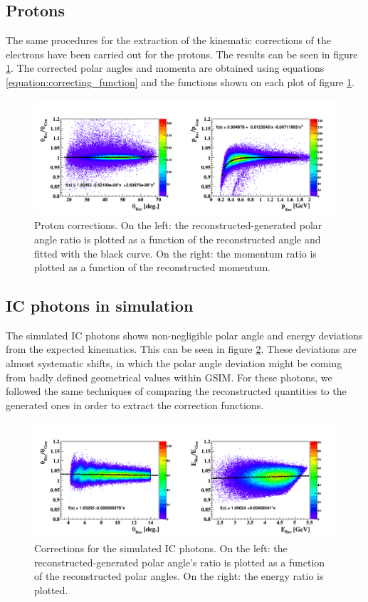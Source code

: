 \subsection{Protons}
The same procedures for the extraction of the kinematic corrections of the electrons have been carried out for the protons. The results can be seen in figure \ref{fig:proton_corrections}. The corrected polar angles and momenta are obtained using equations \ref{equation:correcting_function} and the functions shown on each plot of figure \ref{fig:proton_corrections}. 
\begin{figure}[tp]
\centering
\includegraphics[scale=0.41]{fig_simulation/before_proton_Rec_gen.png}
\caption{Proton corrections. On the left: the reconstructed-generated polar angle ratio is plotted as a function of the reconstructed angle and fitted with the black curve. On the right: the momentum ratio is plotted as a function of the reconstructed momentum.} 
\label{fig:proton_corrections}
\end{figure}


\subsection{IC photons in simulation} 
The simulated IC photons shows non-negligible polar angle and energy deviations from the expected kinematics. This can be seen in figure \ref{fig:simulated_ic_corrections}. These deviations are almost systematic shifts, in which the polar angle deviation might be coming from badly defined geometrical values within GSIM. For these photons, we followed the same techniques of comparing the reconstructed quantities to the generated ones in order to extract the correction functions.

\begin{figure}[tbp]
\centering
\includegraphics[scale=0.41]{fig_simulation/before_gamma_Rec_gen.png}
\caption{Corrections for the simulated IC photons. On the left: the reconstructed-generated polar angle's ratio is plotted as a function of the reconstructed polar angles. On the right: the energy ratio is plotted.} 
\label{fig:simulated_ic_corrections}
\end{figure}

